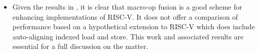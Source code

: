 \begin{itemize}
\item Given the results in \cite{CDPA:16}, it is clear that
    macro-op fusion is a good scheme for enhancing implementations of
    RISC-V.
    It does not offer a comparison of performance based on a
    hypothetical extension to RISC-V which does include
    auto-aligning indexed load and store.
    This work and associated results are essential for a full discussion on
    the matter.
\end{itemize}

